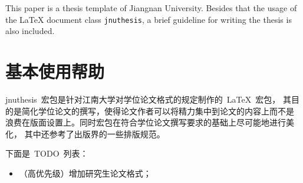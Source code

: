 \documentclass[pdftex, twoside, bachelor]{JNUthesis}
\begin{document}
\begin{spacing}{1.25}
\begin{abstract}

本文是江南大学学位论文的~\LaTeX{}~模板。目前不支持研究生学位论文格式。

除了介绍~\LaTeX{}~文档类~\texttt{jnuthesis}~的用法外，本文还是一
个简要的学位论文写作指南。


\end{abstract}
\pagestyle{abstract}

\begin{englishabstract}

This paper is a thesis template of Jiangnan University. Besides that
the usage of the \LaTeX{} document class \texttt{jnuthesis}, a brief
guideline for writing the thesis is also included.


\end{englishabstract}
\pagestyle{englishabstract}

\clearpage
\pagestyle{plain}
\tableofcontents



\mainmatter

\makeatletter
  \let\ps@plain\ps@main
\makeatother
\pagestyle{main}

\chapter{基本使用帮助}
\label{C:intro}

jnuthesis~宏包是针对江南大学对学位论文格式的规定制作的~\LaTeX{}~宏包，
其目的是简化学位论文的撰写，使得论文作者可以将精力集中到论文的内容上而不是
浪费在版面设置上。同时宏包在符合学位论文撰写要求的基础上尽可能地进行美化，
其中还参考了出版界的一些排版规范。

下面是~TODO~列表：

\begin{itemize}

\item （高优先级）增加研究生论文格式；


\end{itemize}
\end{spacing}
\end{document}

